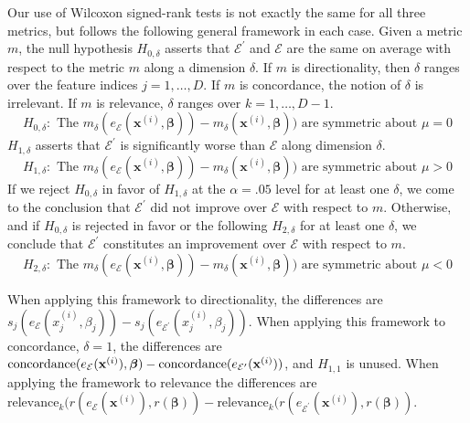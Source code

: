 \documentclass[12pt]{article}  %
\newcommand{\bx}{\mathbf{x}}
\newcommand{\mE}{\mathcal{E}}
\begin{document}
            Our use of Wilcoxon signed-rank tests is not exactly the same for all three metrics, but follows the following general framework in each case.
            Given a metric $m$, the null hypothesis $H_{0,\delta}$ asserts that $\mE^\prime$ and $\mE$ are the same on average with respect to the metric $m$ along a dimension $\delta$. If $m$ is directionality, then $\delta$ ranges over the feature indices $j=1,\ldots,D$. If $m$ is concordance, the notion of $\delta$ is irrelevant. If $m$ is relevance, $\delta$ ranges over $k=1,\ldots,D-1$.
            \begin{equation*}
                H_{0,\delta}: \text{ The } m_\delta(e_\mE(\bx^{(i)},\boldsymbol{\beta})) - m_\delta(\bx^{(i)},\boldsymbol{\beta})) \text{ are symmetric about } \mu = 0
            \end{equation*}
            $H_{1,\delta}$ asserts that $\mE^\prime$ is significantly worse than $\mE$ along dimension $\delta$. 
            \begin{equation*}
                H_{1,\delta}: \text{ The } m_\delta(e_\mE(\bx^{(i)},\boldsymbol{\beta})) - m_\delta(\bx^{(i)},\boldsymbol{\beta})) \text{ are symmetric about } \mu > 0
            \end{equation*}
            If we reject $H_{0,\delta}$ in favor of $H_{1,\delta}$ at the $\alpha=.05$ level for at least one $\delta$, we come to the conclusion that $\mE^{\prime}$ did not improve over $\mE$ with respect to $m$. Otherwise, and if $H_{0,\delta}$ is rejected in favor or the following $H_{2,\delta}$ for at least one $\delta$, we conclude that $\mE^{\prime}$ constitutes an improvement over $\mE$ with respect to $m$.
            \begin{equation*}
                H_{2,\delta}: \text{ The }  m_\delta(e_\mE(\bx^{(i)},\boldsymbol{\beta})) - m_\delta(\bx^{(i)},\boldsymbol{\beta})) \text{ are symmetric about } \mu< 0
            \end{equation*}            
            
            When applying this framework to directionality, the differences are $s_j(e_\mE(x_j^{(i)},\beta_j)) - s_j(e_{\mE^\prime}(x_j^{(i)},\beta_j))$. When applying this framework to concordance, $\delta=1$, the differences are $\text{\text{concordance}}(e_\mE(\mathbf{x}^{(i)}),\boldsymbol{\beta}) - \text{\text{concordance}}(e_{\mE^\prime}(\mathbf{x}^{(i)}))$, and $H_{1,1}$ is unused. When applying the framework to relevance the differences are $\text{relevance}_k(r(e_\mE(\mathbf{x}^{(i)}), r(\boldsymbol{\beta})) - \text{relevance}_k(r(e_{\mE^\prime}(\mathbf{x}^{(i)}), r(\boldsymbol{\beta}))$.
            
\end{document}
